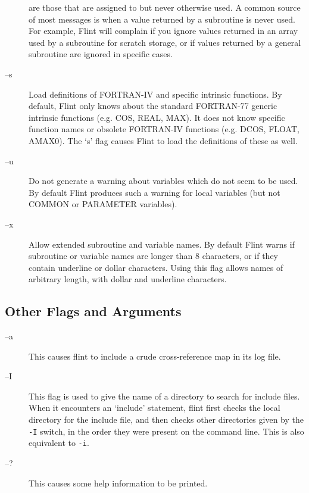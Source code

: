 \documentclass{report}
\begin{document}
\begin{description}
are those that are assigned to but never otherwise used. A common
source of most messages is when a value returned by a subroutine
is never used. For example, Flint will complain if you ignore values
returned in an array used by a subroutine for scratch storage, or if values
returned by a general subroutine are ignored in specific cases.
\item[--s] Load definitions of FORTRAN-IV and specific intrinsic functions.
By default, Flint only knows about the standard FORTRAN-77 generic intrinsic
functions (e.g. COS, REAL, MAX). It does not know specific function names
or obsolete FORTRAN-IV functions (e.g. DCOS, FLOAT, AMAX0). The `s'
flag causes Flint to load the definitions of these as well.
\item[--u] Do not generate a warning about variables which do not seem to be
used. By default Flint produces such a warning for local variables (but
not COMMON or PARAMETER variables).
\item[--x] Allow extended subroutine and variable names. By default Flint
warns if subroutine or variable names are longer than 8 characters, or if
they contain underline or dollar characters. Using this flag
allows names of arbitrary length, with dollar and underline characters.
\end{description}

\subsection{Other Flags and Arguments}
\begin{description}
\item[--a] This causes flint to include a crude cross-reference map in its
log file.
\item[--I] This flag is used to give the name of a directory to search for
include files. When it encounters an `include' statement, flint first checks
the local directory for the include file, and then checks other
directories given by the {\tt -I} switch, in the order they were present
on the command line. This is also equivalent to {\tt -i}.
\item[--?] This causes some help information to be printed.
\end{description}
\end{document}
